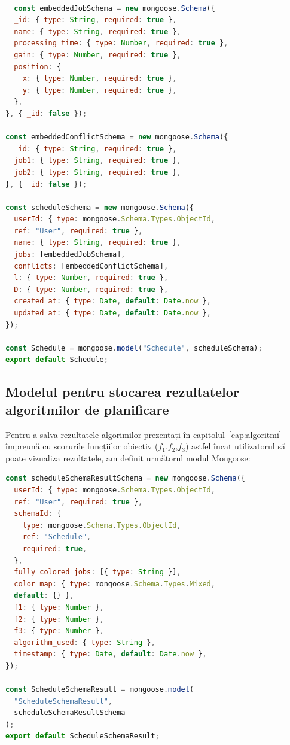 \vspace{2cm}
\begin{lstlisting}[language=JavaScript, caption={Schema modelului de date pentru planificare}, label={Schedule}]

  const embeddedJobSchema = new mongoose.Schema({
  _id: { type: String, required: true },
  name: { type: String, required: true },
  processing_time: { type: Number, required: true },
  gain: { type: Number, required: true },
  position: {
    x: { type: Number, required: true },
    y: { type: Number, required: true },
  },
}, { _id: false });

const embeddedConflictSchema = new mongoose.Schema({
  _id: { type: String, required: true },
  job1: { type: String, required: true },
  job2: { type: String, required: true },
}, { _id: false });

const scheduleSchema = new mongoose.Schema({
  userId: { type: mongoose.Schema.Types.ObjectId, 
  ref: "User", required: true },
  name: { type: String, required: true },
  jobs: [embeddedJobSchema],
  conflicts: [embeddedConflictSchema],
  l: { type: Number, required: true },
  D: { type: Number, required: true },
  created_at: { type: Date, default: Date.now },
  updated_at: { type: Date, default: Date.now },
});

const Schedule = mongoose.model("Schedule", scheduleSchema);
export default Schedule;
\end{lstlisting}


\subsection{Modelul pentru stocarea rezultatelor algoritmilor de planificare}

Pentru a salva rezultatele algorimilor prezentați în capitolul~\ref{cap:algoritmi} împreună cu scorurile funcțiilor obiectiv ($f_1$,$f_2$,$f_3$)
astfel încat utilizatorul să poate vizualiza rezultatele, am definit următorul modul Mongoose:

\begin{lstlisting}[language=JavaScript, caption={Schema modelului de date pentru rezultatul planificării},label={ScheduleResult}
]
const scheduleSchemaResultSchema = new mongoose.Schema({
  userId: { type: mongoose.Schema.Types.ObjectId, 
  ref: "User", required: true },
  schemaId: {
    type: mongoose.Schema.Types.ObjectId,
    ref: "Schedule",
    required: true,
  },
  fully_colored_jobs: [{ type: String }],
  color_map: { type: mongoose.Schema.Types.Mixed, 
  default: {} }, 
  f1: { type: Number },
  f2: { type: Number },
  f3: { type: Number },
  algorithm_used: { type: String },
  timestamp: { type: Date, default: Date.now },
});

const ScheduleSchemaResult = mongoose.model(
  "ScheduleSchemaResult",
  scheduleSchemaResultSchema
);
export default ScheduleSchemaResult;
\end{lstlisting}

